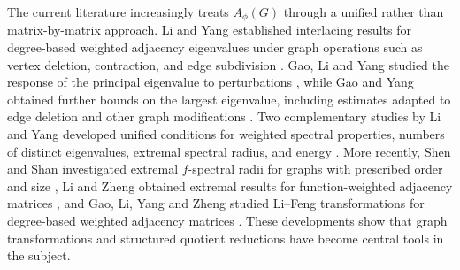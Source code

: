 \documentclass[12pt,twoside]{article}
\begin{document}
The current literature increasingly treats $A_{\phi}(G)$ through a unified rather than matrix-by-matrix approach. Li and Yang established interlacing results for degree-based weighted adjacency eigenvalues under graph operations such as vertex deletion, contraction, and edge subdivision \cite{LiYang2023}. Gao, Li and Yang studied the response of the principal eigenvalue to perturbations \cite{GaoLiYang2024}, while Gao and Yang obtained further bounds on the largest eigenvalue, including estimates adapted to edge deletion and other graph modifications \cite{GaoYang2024}. Two complementary studies by Li and Yang developed unified conditions for weighted spectral properties, numbers of distinct eigenvalues, extremal spectral radius, and energy \cite{LiYangLAA2024,LiYangActa2024}. More recently, Shen and Shan investigated extremal $f$-spectral radii for graphs with prescribed order and size \cite{ShenShan2025}, Li and Zheng obtained extremal results for function-weighted adjacency matrices \cite{LiZheng2025}, and Gao, Li, Yang and Zheng studied Li--Feng transformations for degree-based weighted adjacency matrices \cite{GaoLiYangZheng2025}. These developments show that graph transformations and structured quotient reductions have become central tools in the subject.
\end{document}
